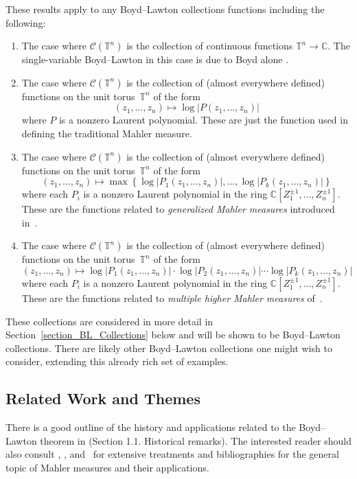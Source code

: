 \documentclass[12pt]{amsart}
\theoremstyle{plain}
\theoremstyle{definition}
\theoremstyle{remark}
\numberwithin{theorem}{section}
\numberwithin{equation}{section} %
\newcommand{\bC}{{\mathbb{C}}}
\newcommand{\mc}{\mathcal}
\newcommand{\torus}{{\mathbb{T}}}
\begin{document}
These results apply to any Boyd--Lawton collections functions including the following:
\begin{enumerate}
\item
The case where $\mc C(\torus^n)$ is the collection of continuous functions $\torus^n \to \bC$.
The single-variable Boyd--Lawton in this case is due to Boyd alone \cite[Lemma~1]{boyd1981}.
\item
The case where $\mc C(\torus^n)$ is the collection of (almost everywhere defined) functions on the unit torus~$\torus^n$ of the form
$$
(z_1, \ldots, z_n) \mapsto \log | P(z_1, \ldots, z_n) |
$$
where $P$ is a nonzero Laurent polynomial.
These are just the function used in defining the traditional Mahler measure.


\item
The case where $\mc C(\torus^n)$ is the collection of (almost everywhere defined) functions on the unit torus~$\torus^n$ of the form
$$
(z_1, \ldots, z_n) \mapsto  \max \left\{ 
    \log | P_1(z_1, \ldots, z_n) |, \ldots, \log| P_k(z_1, \ldots, z_n)| 
    \right\}
$$
where each $P_i$ is a nonzero  Laurent polynomial in the ring  $\bC[Z^{\pm 1}_1, \ldots, Z^{\pm 1}_n]$.
These are the functions related to \emph{generalized Mahler measures} introduced
in~\cite{GonOyanagi2004}.

\item
The case where $\mc C(\torus^n)$ is the collection of (almost everywhere defined) functions on the unit torus~$\torus^n$ of the form
$$
(z_1, \ldots, z_n) \mapsto  
    \log | P_1(z_1, \ldots, z_n) | \cdot \log | P_2(z_1, \ldots, z_n) | \cdots \log| P_k(z_1, \ldots, z_n)| 
$$
where each $P_i$ is a nonzero  Laurent polynomial in the ring  $\bC[Z^{\pm 1}_1, \ldots, Z^{\pm 1}_n]$.
These are the functions related to \emph{multiple higher Mahler measures} of~\cite{Kurokawa2008}.
\end{enumerate}
These collections are considered in more detail in Section~\ref{section_BL_Collections} below and will be shown to be Boyd--Lawton collections.
There are likely other  Boyd--Lawton collections one might wish to consider, extending this already rich set of examples.



\subsection{Related Work and Themes}


There is a good outline of the history and applications related to the Boyd--Lawton theorem
in \cite{Brunault2024} (Section 1.1. Historical remarks). 
The interested reader should also consult
\cite{BertinLalin},
\cite{Brunault_Zudilin_2020}, and~\cite{McKee_Smyth_2021} for  extensive treatments and bibliographies for the general topic of Mahler measures and their applications.  
\end{document}

